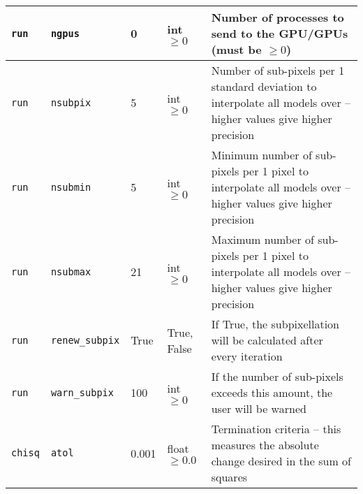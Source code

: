 \begin{center}
\begin{longtable}{p{1.5cm}p{2.5cm}p{2.0cm}p{2.0cm}p{5.0cm}}
\multicolumn{1}{p{1.5cm}}{\texttt{run}} &
\multicolumn{1}{p{2.5cm}}{\texttt{ngpus}} &
\multicolumn{1}{p{2.0cm}}{0} &
\multicolumn{1}{p{2.0cm}}{int $\ge0$} &
\multicolumn{1}{p{5.0cm}}{Number of processes to send to the GPU/GPUs (must be $\ge0$)} \\ \midrule

\multicolumn{1}{p{1.5cm}}{\texttt{run}} &
\multicolumn{1}{p{2.5cm}}{\texttt{nsubpix}} &
\multicolumn{1}{p{2.0cm}}{5} &
\multicolumn{1}{p{2.0cm}}{int $\ge0$} &
\multicolumn{1}{p{5.0cm}}{Number of sub-pixels per 1 standard deviation to interpolate all models over -- higher values give higher precision} \\ \midrule

\multicolumn{1}{p{1.5cm}}{\texttt{run}} &
\multicolumn{1}{p{2.5cm}}{\texttt{nsubmin}} &
\multicolumn{1}{p{2.0cm}}{5} &
\multicolumn{1}{p{2.0cm}}{int $\ge0$} &
\multicolumn{1}{p{5.0cm}}{Minimum number of sub-pixels per 1 pixel to interpolate all models over -- higher values give higher precision} \\ \midrule

\multicolumn{1}{p{1.5cm}}{\texttt{run}} &
\multicolumn{1}{p{2.5cm}}{\texttt{nsubmax}} &
\multicolumn{1}{p{2.0cm}}{21} &
\multicolumn{1}{p{2.0cm}}{int $\ge0$} &
\multicolumn{1}{p{5.0cm}}{Maximum number of sub-pixels per 1 pixel to interpolate all models over -- higher values give higher precision} \\ \midrule

\multicolumn{1}{p{1.5cm}}{\texttt{run}} &
\multicolumn{1}{p{2.5cm}}{\texttt{renew\_subpix}} &
\multicolumn{1}{p{2.0cm}}{True} &
\multicolumn{1}{p{2.0cm}}{True, False} &
\multicolumn{1}{p{5.0cm}}{If True, the subpixellation will be calculated after every iteration} \\ \midrule

\multicolumn{1}{p{1.5cm}}{\texttt{run}} &
\multicolumn{1}{p{2.5cm}}{\texttt{warn\_subpix}} &
\multicolumn{1}{p{2.0cm}}{100} &
\multicolumn{1}{p{2.0cm}}{int $\ge0$} &
\multicolumn{1}{p{5.0cm}}{If the number of sub-pixels exceeds this amount, the user will be warned} \\ \midrule

\multicolumn{1}{p{1.5cm}}{\texttt{chisq}} &
\multicolumn{1}{p{2.5cm}}{\texttt{atol}} &
\multicolumn{1}{p{2.0cm}}{0.001} &
\multicolumn{1}{p{2.0cm}}{float $\ge0.0$} &
\multicolumn{1}{p{5.0cm}}{Termination criteria -- this measures the absolute change desired in the sum of squares} \\ \midrule


\end{longtable}
\end{center}
